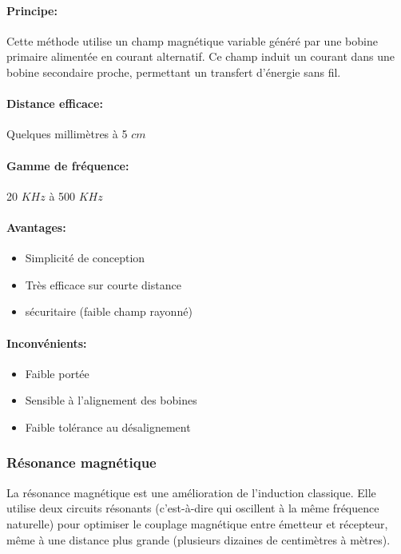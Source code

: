 \documentclass[12pt,a4paper,titlepage,notitlepage]{article}
\begin{document}
	\paragraph{Principe: \\}
	Cette méthode utilise un champ magnétique variable généré par une bobine primaire alimentée en courant alternatif. Ce champ induit un courant dans une bobine secondaire proche, permettant un transfert d’énergie sans fil.
	\paragraph{Distance efficace: \\}
	Quelques millimètres à 5 $cm$
	\paragraph{Gamme de fréquence: \\}
	20 $KHz$ à 500 $KHz$
	\paragraph{Avantages: }
	\begin{itemize}
		\item Simplicité de conception
		\item Très efficace sur courte distance
		\item sécuritaire (faible champ rayonné)
	\end{itemize}
	\paragraph{Inconvénients: }
	\begin{itemize}
		\item Faible portée
		\item Sensible à l’alignement des bobines
		\item Faible tolérance au désalignement
	\end{itemize}
	
	
	\subsubsection{Résonance magnétique}
	La résonance magnétique est une amélioration de l’induction classique. Elle utilise deux circuits résonants (c’est-à-dire qui oscillent à la même fréquence naturelle) pour optimiser le couplage magnétique entre émetteur et récepteur, même à une distance plus grande (plusieurs dizaines de centimètres à mètres).
	
\end{document}
